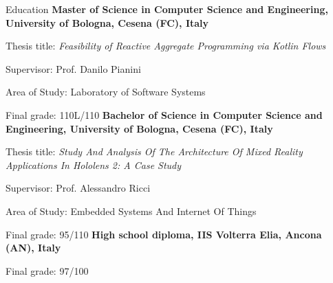 \begin{rubric}{Education}
\entry*[2021 -- 2024]%
	\textbf{Master of Science in Computer Science and Engineering, University of Bologna, Cesena (FC), Italy}
	\par Thesis title: \emph{Feasibility of Reactive Aggregate Programming via Kotlin Flows}
	\par Supervisor: Prof. Danilo Pianini
	\par Area of Study: Laboratory of Software Systems
	\par Final grade: 110L/110
%
\entry*[2018 -- 2021]%
	\textbf{Bachelor of Science in Computer Science and Engineering, University of Bologna, Cesena (FC), Italy}
	\par Thesis title: \emph{Study And Analysis Of The Architecture Of Mixed Reality Applications In Hololens 2: A Case Study}
	\par Supervisor: Prof. Alessandro Ricci
	\par Area of Study: Embedded Systems And Internet Of Things
	\par Final grade: 95/110
% 
\entry*[2013 -- 2018]%
	\textbf{High school diploma, IIS Volterra Elia, Ancona (AN), Italy}
	\par Final grade: 97/100
\end{rubric}